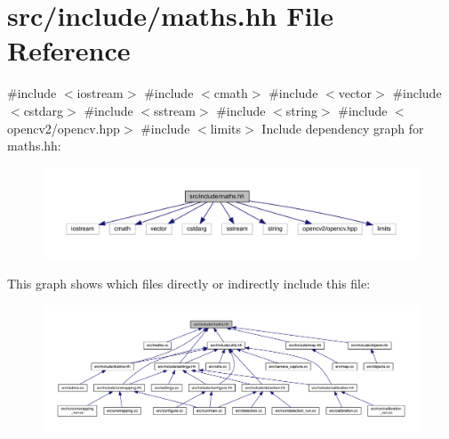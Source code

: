 \hypertarget{maths_8hh}{}\section{src/include/maths.hh File Reference}
\label{maths_8hh}
{\ttfamily \#include $<$iostream$>$}\newline
{\ttfamily \#include $<$cmath$>$}\newline
{\ttfamily \#include $<$vector$>$}\newline
{\ttfamily \#include $<$cstdarg$>$}\newline
{\ttfamily \#include $<$sstream$>$}\newline
{\ttfamily \#include $<$string$>$}\newline
{\ttfamily \#include $<$opencv2/opencv.\+hpp$>$}\newline
{\ttfamily \#include $<$limits$>$}\newline
Include dependency graph for maths.\+hh\+:
\nopagebreak
\begin{figure}[H]
\begin{center}
\leavevmode
\includegraphics[width=350pt]{maths_8hh__incl}
\end{center}
\end{figure}
This graph shows which files directly or indirectly include this file\+:
\nopagebreak
\begin{figure}[H]
\begin{center}
\leavevmode
\includegraphics[width=350pt]{maths_8hh__dep__incl}
\end{center}
\end{figure}
